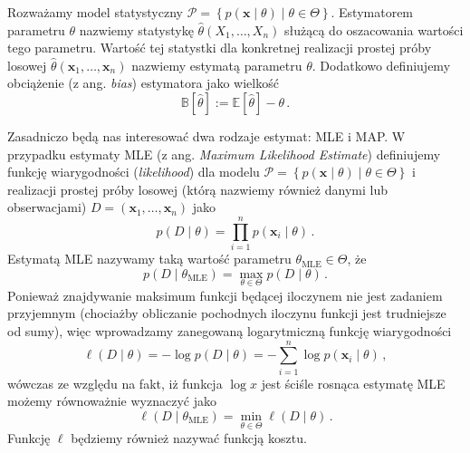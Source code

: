 \documentclass{myclass}
\begin{document}
Rozważamy model statystyczny \(\mathcal{P} = \left\{p(\mathbf{x} \mid \theta) \mid \theta \in
\Theta\right\}\). Estymatorem parametru \(\theta\) nazwiemy statystykę
\(\hat{\theta}(X_1,\ldots,X_n)\) służącą do oszacowania wartości tego parametru. Wartość tej
statystki dla konkretnej realizacji prostej próby losowej
\(\hat{\theta}(\mathbf{x}_1,\ldots,\mathbf{x}_n)\) nazwiemy estymatą parametru \(\theta\). Dodatkowo
definiujemy obciążenie (z ang. \textit{bias}) estymatora jako wielkość
\begin{equation*}
    \mathbb{B}[\hat{\theta}] := \mathbb{E}[\hat{\theta}] - \theta\,.
\end{equation*}

Zasadniczo będą nas interesować dwa rodzaje estymat: MLE i MAP. W przypadku estymaty MLE (z ang.
\textit{Maximum Likelihood Estimate}) definiujemy funkcję wiarygodności (\textit{likelihood}) dla
modelu \(\mathcal{P} = \left\{p(\mathbf{x} \mid \theta) \mid \theta \in \Theta\right\}\) i
realizacji prostej próby losowej (którą nazwiemy również danymi lub obserwacjami)
\(D=(\mathbf{x}_1,\ldots,\mathbf{x}_n)\) jako
\begin{equation*}
    p(D \mid \theta) = \prod_{i=1}^n p(\mathbf{x}_i \mid \theta)\,.
\end{equation*}
Estymatą MLE nazywamy taką wartość parametru \(\theta_\text{MLE} \in \Theta\), że
\begin{equation*}
    p(D \mid \theta_\text{MLE}) = \max_{\theta \in \Theta} p(D \mid \theta)\,.
\end{equation*}
Ponieważ znajdywanie maksimum funkcji będącej iloczynem nie jest zadaniem przyjemnym (chociażby
obliczanie pochodnych iloczynu funkcji jest trudniejsze od sumy), więc wprowadzamy zanegowaną
logarytmiczną funkcję wiarygodności
\begin{equation*}
    \ell(D \mid \theta) = -\log p(D \mid \theta) = -\sum_{i=1}^n \log p(\mathbf{x}_i \mid \theta)\,,
\end{equation*}
wówczas ze względu na fakt, iż funkcja \(\log x\) jest ściśle rosnąca estymatę MLE możemy
równoważnie wyznaczyć jako
\begin{equation*}
    \ell(D \mid \theta_\text{MLE}) = \min_{\theta \in \Theta} \ell(D \mid \theta)\,.
\end{equation*}
Funkcję \(\ell\) będziemy również nazywać funkcją kosztu.
\end{document}

